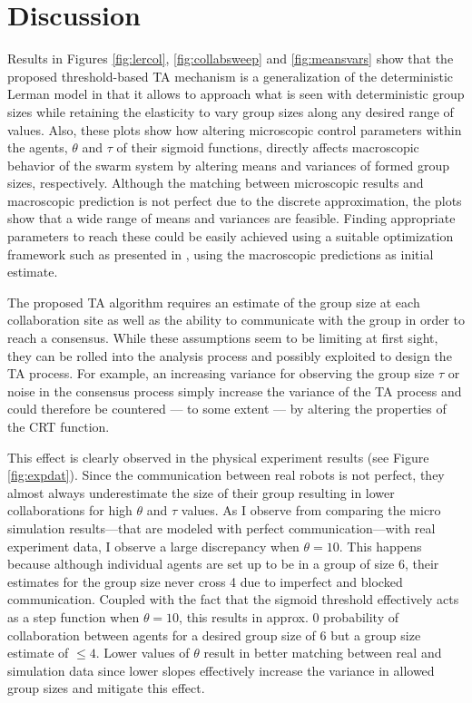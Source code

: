 \documentclass[12pt]{book}
\begin{document}
\section{Discussion}
Results in Figures \ref{fig:lercol}, \ref{fig:collabsweep} and \ref{fig:meansvars} show that the proposed threshold-based TA mechanism is a generalization of the deterministic Lerman model in that it allows to approach what is seen with deterministic group sizes while retaining the elasticity to vary group sizes along any desired range of values. Also, these plots show how altering microscopic control parameters within the agents, $\theta$ and $\tau$ of their sigmoid functions, directly affects macroscopic behavior of the swarm system by altering means and variances of formed group sizes, respectively. Although the matching between microscopic results and macroscopic prediction is not perfect due to the discrete approximation, the plots show that a wide range of means and variances are feasible. Finding appropriate parameters to reach these could be easily achieved using a suitable optimization framework such as presented in \cite{Correll2008,Berman2009}, using the macroscopic predictions as initial estimate. 

The proposed TA algorithm requires an estimate of the group size at each collaboration site as well as the ability to communicate with the group in order to reach a consensus. While these assumptions seem to be limiting at first sight, they can be rolled into the analysis process and possibly exploited to design the TA process. For example, an increasing variance for observing the group size $\tau$ or noise in the consensus process simply increase the variance of the TA process and could therefore be countered --- to some extent --- by altering the properties of the CRT function. 

This effect is clearly observed in the physical experiment results (see Figure \ref{fig:expdat}). Since the communication between real robots is not perfect, they almost always  underestimate the size of their group resulting in lower collaborations for high $\theta$ and $\tau$ values. As I observe from comparing the micro simulation results---that are modeled with perfect communication---with real experiment data, I observe a large discrepancy when $\theta = 10$. This happens because although individual agents are set up to be in a group of size 6, their estimates for the group size never cross 4 due to imperfect and blocked communication. Coupled with the fact that the sigmoid threshold effectively acts as a step function when $\theta = 10$, this results in approx. 0 probability of collaboration between agents for a desired group size of 6 but a group size estimate of $\leq 4$. Lower values of $\theta$ result in better matching between real and simulation data since lower slopes effectively increase the variance in allowed group sizes and mitigate this effect.
\end{document}
